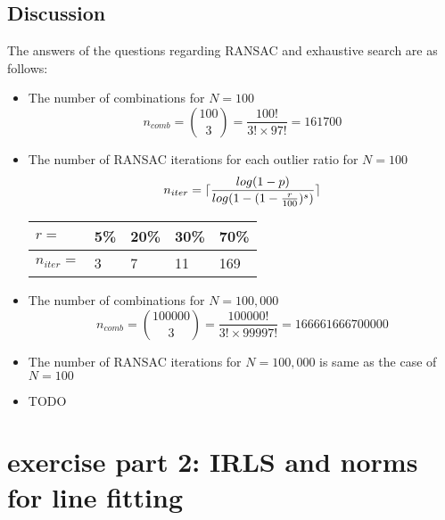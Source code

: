 \documentclass[paper=a4, fontsize=11pt]{scrartcl} %
\DeclarePairedDelimiter{\ceil}{\lceil}{\rceil}
\numberwithin{equation}{section} %
\numberwithin{figure}{section} %
\numberwithin{table}{section} %
\begin{document}
\subsection{Discussion}

The answers of the questions regarding RANSAC and exhaustive search are as follows:

\begin{itemize}
\item The number of combinations for $N = 100$ 
    \begin{equation*}
    n_{comb} = \binom{100}{3}=\frac{100!}{3! \times 97!}=161700
    \end{equation*}
\item The number of RANSAC iterations for each outlier ratio for $N = 100$
    \begin{equation*}
    n_{iter} = \ceil{ \frac{log(1 - p)}{log(1 - (1 - \frac{r}{100}) ^ {s})} }
    \end{equation*}
    \begin{center}
        \begin{tabular}{ | l | l | l | l | l | }
        \hline
        $r =$ & 5\% & 20\% & 30\% & 70\% \\ \hline
        $n_{iter} = $ & 3 & 7 & 11 & 169 \\ \hline
        \end{tabular}
    \end{center}
\item The number of combinations for $N = 100,000$ 
\begin{equation*}
n_{comb} = \binom{100000}{3}=\frac{100000!}{3! \times 99997!}=166661666700000
\end{equation*}
\item The number of RANSAC iterations for $N = 100,000$ is same as the case of $N = 100$
\item TODO
\end{itemize}


\section{exercise part 2: IRLS and norms for line fitting}

\end{document}
